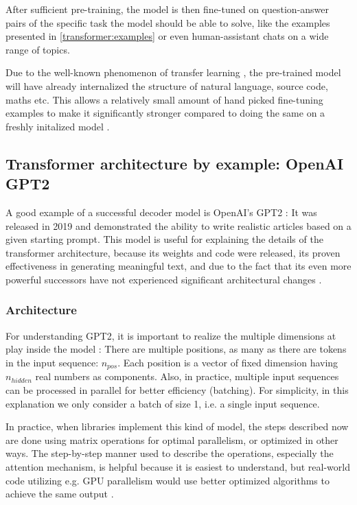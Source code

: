 After sufficient pre-training, the model is then fine-tuned on question-answer pairs of the specific task the model should be able to solve, like the examples presented in \ref{transformer:examples} or even human-assistant chats on a wide range of topics.

Due to the well-known phenomenon of transfer learning \cite{transferlearning}, the pre-trained model will have already internalized the structure of natural language, source code, maths etc. 
This allows a relatively small amount of hand picked fine-tuning examples to make it significantly stronger compared to doing the same on a freshly initalized model .

\subsection{Transformer architecture by example: OpenAI GPT2}

A good example of a successful decoder model is OpenAI's GPT2 \cite{unsupervisedmultitask} \cite{OpenAI2019BetterLM} \cite[source code]{HuggingFaceGPT2}: It was released in 2019 and demonstrated the ability to write realistic articles based on a given starting prompt. This model is useful for explaining the details of the transformer architecture, because its weights and code were released, its proven effectiveness in generating meaningful text, and due to the fact that its even more powerful successors have not experienced significant architectural changes \cite{OpenGenus2023GPTComparison}.

\subsubsection{Architecture}


For understanding GPT2, it is important to realize the multiple dimensions at play inside the model \cite{alammar-gpt2} :
There are multiple positions, as many as there are tokens in the input sequence: $n_{pos}$.
Each position is a vector of fixed dimension having $n_{hidden}$ real numbers as components.
Also, in practice, multiple input sequences can be processed in parallel for better efficiency (batching).
For simplicity, in this explanation we only consider a batch of size 1, i.e. a single input sequence.

In practice, when libraries implement this kind of model, the steps described now are done using matrix operations
for optimal parallelism, or optimized in other ways. The step-by-step manner used to describe the operations,
especially the attention mechanism, is helpful because it is easiest to understand, but real-world code
utilizing e.g. GPU parallelism would use better optimized algorithms to achieve the same output \cite{choi2023unleashing} . 

